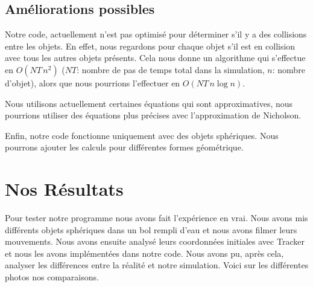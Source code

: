     \subsection{Améliorations possibles}
        Notre code, actuellement n'est pas optimisé pour déterminer s'il y a des collisions entre les objets. En effet, nous regardons pour chaque objet s'il est en collision avec tous les autres objets présents. Cela nous donne un algorithme qui s'effectue en $O(NT\,n^2)$ ($NT$: nombre de pas de temps total dans la simulation, $n$: nombre d'objet), alors que nous pourrions l'effectuer en $O(NT\, n\log n)$. %

        Nous utilisons actuellement certaines équations qui sont approximatives, nous pourrions utiliser des équations plus précises avec l'approximation de Nicholson.

        Enfin, notre code fonctionne uniquement avec des objets sphériques. Nous pourrons ajouter les calculs pour différentes formes géométrique. 
\section{Nos Résultats}
    Pour tester notre programme nous avons fait l'expérience en vrai. Nous avons mis différents objets sphériques dans un bol rempli d'eau et nous avons filmer leurs mouvements. Nous avons ensuite analysé leurs coordonnées initiales avec Tracker et nous les avons implémentées dans notre code. Nous avons pu, après cela, analyser les différences entre la réalité et notre simulation. Voici sur les différentes photos nos comparaisons.
